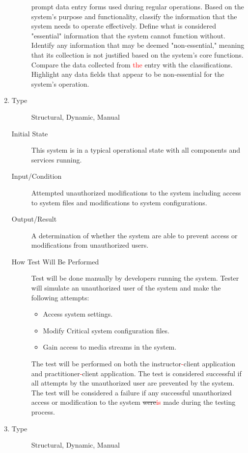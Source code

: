 \documentclass[12pt, titlepage]{article}
\newcommand{\rt}[1]{\textcolor{red}{#1}}
\begin{document}
\begin{enumerate}[NFR-T1]
\begin{description}
    prompt data entry forms used during regular operations. Based on the
    system’s purpose and functionality, classify the information that the system
    needs to operate effectively. Define what is considered "essential"
    information that the system cannot function without. Identify any
    information that may be deemed "non-essential," meaning that its collection
    is not justified based on the system’s core functions. Compare the data
    collected from \rt{the} entry with the classifications. Highlight any data fields
    that appear to be non-essential for the system’s operation.
  \end{description}
\item \label{NFRT23}
  \begin{description}
  \item[Type] Structural, Dynamic, Manual
  \item[Initial State] This system is in a typical operational state with all
    components and services running.
  \item[Input/Condition] Attempted unauthorized modifications to the system
    including access to system files and modifications to system configurations.
  \item[Output/Result] A determination of whether the system are able to prevent
    access or modifications from unauthorized users.
  \item[How Test Will Be Performed] Test will be done manually by developers
    running the system. Tester will simulate an unauthorized user of the system
    and make the following attempts:
    \begin{itemize}
    \item Access system settings.
    \item Modify Critical system configuration files.
    \item Gain access to media streams in the system.
    \end{itemize}
    The test will be performed on both the instructor\rt{-}client application and
    practitioner\rt{-}client application. The test is considered successful if all
    attempts by the unauthorized user are prevented by the system. The test will
    be considered a failure if any successful unauthorized access or
    modification to the system \sout{were}\rt{is} made during the testing process.
  \end{description}
\item \label{NFRT24}
  \begin{description}
  \item[Type] Structural, Dynamic, Manual

\end{description}
\end{enumerate}
\end{document}
